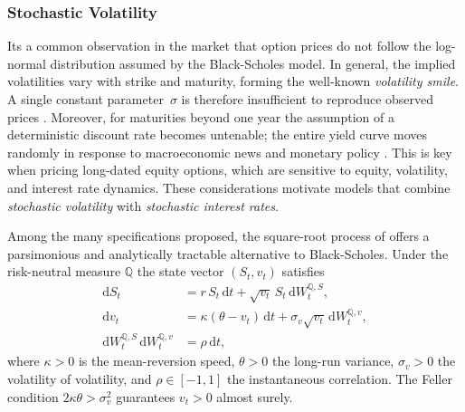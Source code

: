 \documentclass[12pt]{report} %
\theoremstyle{plain}           %
\theoremstyle{definition}      %
\theoremstyle{remark}          %
\begin{document}
\subsubsection{Stochastic Volatility}
Its a common observation in the market that option prices do not follow the
log-normal distribution assumed by the Black-Scholes model. In general, the implied volatilities vary with strike and
maturity, forming the well-known \emph{volatility smile}. A single constant parameter~$\sigma$ is
therefore insufficient to reproduce observed prices \cite{Wilmott2010PaulWO}.  
Moreover, for maturities beyond one year the assumption of a
deterministic discount rate becomes untenable; the entire yield curve
moves randomly in response to macroeconomic news and monetary policy
\cite{Wilmott2010PaulWO}. This is key when pricing long-dated
equity options, which are sensitive to equity, volatility, and interest rate dynamics.  These
considerations motivate models that combine \emph{stochastic
volatility} with \emph{stochastic interest rates}.

Among the many specifications proposed, the square-root process of
\cite{hestonmodel} offers a parsimonious and analytically tractable
alternative to Black-Scholes.  Under the risk-neutral measure
$\mathbb{Q}$ the state vector $(S_t,v_t)$ satisfies
\begin{equation}\label{eq:heston_sde}
\begin{aligned}
  \mathrm{d}S_t &= r\,S_t\,\mathrm{d}t
                + \sqrt{v_t}\,S_t\,\mathrm{d}W_t^{\mathbb{Q},S},\\
  \mathrm{d}v_t &= \kappa(\theta-v_t)\,\mathrm{d}t
                + \sigma_v\sqrt{v_t}\,\mathrm{d}W_t^{\mathbb{Q},v},\\
  \mathrm{d}W_t^{\mathbb{Q},S}\,\mathrm{d}W_t^{\mathbb{Q},v}
                &=\rho\,\mathrm{d}t,
\end{aligned}
\end{equation}
where $\kappa>0$ is the mean-reversion speed,
$\theta>0$ the long-run variance,
$\sigma_v>0$ the volatility of volatility, and
$\rho\in[-1,1]$ the instantaneous correlation.
The Feller condition $2\kappa\theta\!>\!\sigma_v^{2}$
guarantees $v_t>0$ almost surely.
\end{document}
